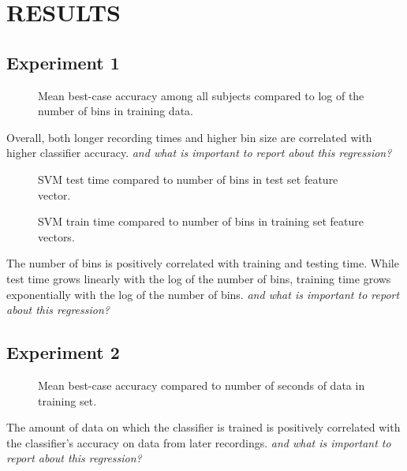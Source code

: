 \section{\uppercase{Results}}

\subsection{Experiment 1}

\begin{figure}[!h]
  \vspace{-0.2cm}
  \centering
   {}
  \caption{Mean best-case accuracy among all subjects compared to log of the number of bins in training data.}
  \label{fig:fig1}
  \vspace{-0.1cm}
 \end{figure}

Overall, both longer recording times and higher bin size are correlated with higher classifier accuracy. \textit{and what is important to report about this regression?}

\begin{figure}[!h]
  \vspace{-0.2cm}
  \centering
   {}
  \caption{SVM test time compared to number of bins in test set feature vector.}
  \label{fig:fig2}
  \vspace{-0.1cm}
\end{figure}

\begin{figure}[!h]
  \vspace{-0.2cm}
  \centering
   {}
  \caption{SVM train time compared to number of bins in training set feature vectors.}
  \label{fig:fig2}
  \vspace{-0.1cm}
\end{figure}


The number of bins is positively correlated with training and testing time. While test time grows linearly with the log of the number of bins, training time grows exponentially with the log of the number of bins. \textit{and what is important to report about this regression?}

\subsection{Experiment 2}

\begin{figure}[!h]
  \vspace{-0.2cm}
  \centering
   {}
  \caption{Mean best-case accuracy compared to number of seconds of data in training set.}
  \label{fig:fig2}
  \vspace{-0.1cm}
\end{figure}

 The amount of data on which the classifier is trained is positively correlated with the classifier's accuracy on data from later recordings. \textit{and what is important to report about this regression?}
